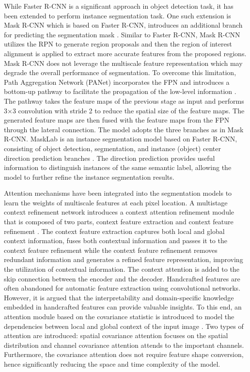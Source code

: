 \documentclass[preprint,12pt]{elsarticle}
\begin{document}
While Faster R-CNN is a significant approach in object detection task, it has been extended to perform instance segmentation task. One such extension is Mask R-CNN which is based on Faster R-CNN, introduces an additional branch for predicting the segmentation mask \citep{he_mask_2017}. Similar to Faster R-CNN, Mask R-CNN utilizes the RPN to generate region proposals and then the region of interest alignment is applied to extract more accurate features from the proposed regions. Mask R-CNN does not leverage the multiscale feature representation which may degrade the overall performance of segmentation. To overcome this limitation, Path Aggregation Network (PANet) incorporates the FPN and introduces a bottom-up pathway to facilitate the propagation of the low-level information \citep{liu_path_2018}. The pathway takes the feature maps of the previous stage as input and performs 3×3 convolution with stride 2 to reduce the spatial size of the feature maps. The generated feature maps are then fused with the feature maps from the FPN through the lateral connection. The model adopts the three branches as in Mask R-CNN. MaskLab is an instance segmentation model based on Faster R-CNN, consisting of object detection, segmentation, and instance (object) center direction prediction branches \citep{chen_masklab_2018}. The direction prediction provides useful information to distinguish instances of the same semantic label, allowing the model to further refine the instance segmentation results.

Attention mechanisms have been integrated into the segmentation models to learn the weights of multiscale features at each pixel location. A multistage context refinement network introduces a context attention refinement module that is composed of two parts, context feature extraction and context feature refinement \citep{liu_multi-stage_2023}. The context feature extraction captures both local and global context information, fuses both contextual information and passes it to the context feature refinement while the context feature refinement removes redundant information and generates a refined feature representation, improving the utilization of contextual information. The context attention is added to the skip connection between the encoder and the decoder. Handcrafted features are often abandoned for automatic feature extraction using convolutional networks. However, it is argued that the interpretability and domain-specific knowledge embedded in handcrafted features can provide valuable insights. To this end, an attention module based on the covariance statistic is introduced to model the dependencies between local and global context of the input image \citep{liu_covariance_2022}. Two types of attention are introduced: spatial covariance attention focuses on the spatial distribution and channel covariance attention attends to the important channels. Furthermore, the covariance attention does not require feature shape conversion, hence significantly reducing the space and time complexity of the model.
\end{document}
